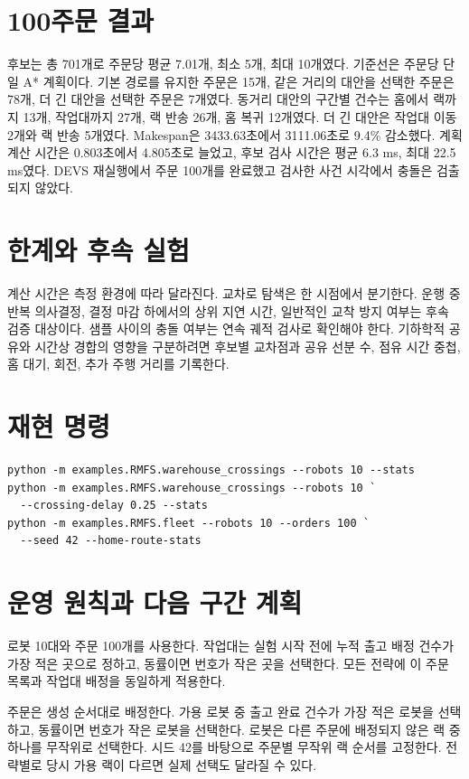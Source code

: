 \documentclass[11pt]{article}
\begin{document}
\section{100주문 결과}
후보는 총 701개로 주문당 평균 7.01개, 최소 5개, 최대 10개였다. 기준선은 주문당 단일 A* 계획이다. 기본 경로를 유지한 주문은 15개, 같은 거리의 대안을 선택한 주문은 78개, 더 긴 대안을 선택한 주문은 7개였다. 동거리 대안의 구간별 건수는 홈에서 랙까지 13개, 작업대까지 27개, 랙 반송 26개, 홈 복귀 12개였다. 더 긴 대안은 작업대 이동 2개와 랙 반송 5개였다. Makespan은 3433.63초에서 3111.06초로 9.4\% 감소했다. 계획 계산 시간은 0.803초에서 4.805초로 늘었고, 후보 검사 시간은 평균 6.3 ms, 최대 22.5 ms였다. DEVS 재실행에서 주문 100개를 완료했고 검사한 사건 시각에서 충돌은 검출되지 않았다.

\section{한계와 후속 실험}
계산 시간은 측정 환경에 따라 달라진다. 교차로 탐색은 한 시점에서 분기한다. 운행 중 반복 의사결정, 결정 마감 하에서의 상위 지연 시간, 일반적인 교착 방지 여부는 후속 검증 대상이다. 샘플 사이의 충돌 여부는 연속 궤적 검사로 확인해야 한다. 기하학적 공유와 시간상 경합의 영향을 구분하려면 후보별 교차점과 공유 선분 수, 점유 시간 중첩, 홈 대기, 회전, 추가 주행 거리를 기록한다.

\section{재현 명령}
{\small
\begin{verbatim}
python -m examples.RMFS.warehouse_crossings --robots 10 --stats
python -m examples.RMFS.warehouse_crossings --robots 10 `
  --crossing-delay 0.25 --stats
python -m examples.RMFS.fleet --robots 10 --orders 100 `
  --seed 42 --home-route-stats
\end{verbatim}
}

\section{운영 원칙과 다음 구간 계획}
로봇 10대와 주문 100개를 사용한다. 작업대는 실험 시작 전에 누적 출고 배정 건수가 가장 적은 곳으로 정하고, 동률이면 번호가 작은 곳을 선택한다. 모든 전략에 이 주문 목록과 작업대 배정을 동일하게 적용한다.

주문은 생성 순서대로 배정한다. 가용 로봇 중 출고 완료 건수가 가장 적은 로봇을 선택하고, 동률이면 번호가 작은 로봇을 선택한다. 로봇은 다른 주문에 배정되지 않은 랙 중 하나를 무작위로 선택한다. 시드 42를 바탕으로 주문별 무작위 랙 순서를 고정한다. 전략별로 당시 가용 랙이 다르면 실제 선택도 달라질 수 있다.
\end{document}

